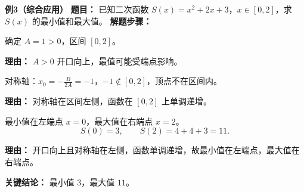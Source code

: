 \begin{examplebox}
	\medskip
	\textbf{\textcolor{CExample}{例3（综合应用）}}
	\textbf{\textcolor{CExample}{题目：}}
	已知二次函数 $S(x)=x^{2}+2x+3$，$x\in[0,2]$，求 $S(x)$ 的最小值和最大值。
	\textbf{\textcolor{CExample}{解题步骤：}}
	\begin{description}[style=nextline, leftmargin=2.8em, labelsep=0.5em, itemsep=0.45em]
		\item[\textbf{第一步（识别参数）：}]
			确定 $A=1>0$，区间 $[0,2]$。
			\par\textbf{理由：} $A>0$ 开口向上，最值可能受端点影响。
		\item[\textbf{第二步（对称轴判定）：}]
			对称轴：$x_{0}=-\frac{B}{2A}=-1$，$-1\notin[0,2]$，顶点不在区间内。
			\par\textbf{理由：} 对称轴在区间左侧，函数在 $[0,2]$ 上单调递增。
		\item[\textbf{第三步（端点最值）：}]
			最小值在左端点 $x=0$，最大值在右端点 $x=2$。
			\[
				S(0)=3,
				\qquad
				S(2)=4+4+3=11.
			\]
			\par\textbf{理由：} 开口向上且对称轴在左侧，函数单调递增，故最小值在左端点，最大值在右端点。
	\end{description}
	\textbf{\textcolor{CExample}{关键结论：}}
	最小值 $3$，最大值 $11$。
\end{examplebox}
